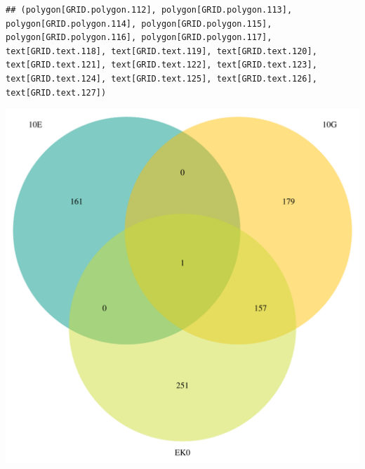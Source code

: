 \documentclass{article}\usepackage[]{graphicx}\usepackage[]{color}
\makeatletter
\newenvironment{kframe}{%
 \def\at@end@of@kframe{}%
 \ifinner\ifhmode%
  \def\at@end@of@kframe{\end{minipage}}%
  \begin{minipage}{\columnwidth}%
 \fi\fi%
 \def\FrameCommand##1{\hskip\@totalleftmargin \hskip-\fboxsep
 \colorbox{shadecolor}{##1}\hskip-\fboxsep
     \hskip-\linewidth \hskip-\@totalleftmargin \hskip\columnwidth}%
 \MakeFramed {\advance\hsize-\width
   \@totalleftmargin\z@ \linewidth\hsize
   \@setminipage}}%
 {\par\unskip\endMakeFramed%
 \at@end@of@kframe}
\newenvironment{knitrout}{}{} %
\makeatother
\begin{document}
\begin{knitrout}
\color{fgcolor}\begin{kframe}
\begin{verbatim}
## (polygon[GRID.polygon.112], polygon[GRID.polygon.113], polygon[GRID.polygon.114], polygon[GRID.polygon.115], polygon[GRID.polygon.116], polygon[GRID.polygon.117], text[GRID.text.118], text[GRID.text.119], text[GRID.text.120], text[GRID.text.121], text[GRID.text.122], text[GRID.text.123], text[GRID.text.124], text[GRID.text.125], text[GRID.text.126], text[GRID.text.127])
\end{verbatim}
\end{kframe}

{\centering \includegraphics[width=1\linewidth,height=.4\textheight]{figure/minimal-venn_t3_3fc_down_venn-1} 

}



\end{knitrout}
\end{document}
